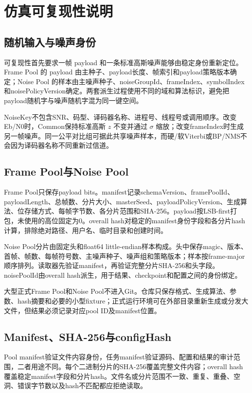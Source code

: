 \chapter{仿真可复现性说明}\label{app:reproducibility}

\section{随机输入与噪声身份}

可复现性首先要求一帧 payload 和一条标准高斯噪声能够由稳定身份重新定位。Frame Pool 的 payload 由主种子、payload长度、帧索引和payload策略版本确定；Noise Pool 的样本由主噪声种子、noiseGroupId、frameIndex、symbolIndex和noisePolicyVersion确定。两套派生过程使用不同的域和算法标识，避免把payload随机字与噪声随机字混为同一键空间。

NoiseKey不包含SNR、码型、译码器名称、进程号、线程号或调用顺序。改变Eb/N0时，Common保持标准高斯 $z$ 不变并通过 $\sigma$ 缩放；改变frameIndex时生成另一帧噪声。同一公平对比组可据此共享噪声样本，而硬/软Viterbi或BP/NMS不会因为译码器名称不同重新过信道。

\section{Frame Pool与Noise Pool}

Frame Pool只保存payload bits。manifest记录schemaVersion、framePoolId、payloadLength、总帧数、分片大小、masterSeed、payloadPolicyVersion、生成算法、位存储方式、每帧字节数、各分片范围和SHA-256。payload按LSB-first打包，未使用的高位固定为0。overall hash对稳定的manifest身份字段和各分片hash计算，排除绝对路径、用户名、临时目录和创建时间。

Noise Pool分片由固定头和float64 little-endian样本构成。头中保存magic、版本、首帧、帧数、每帧符号数、主噪声种子、噪声组和策略版本；样本按frame-major顺序排列。读取器先验证manifest，再验证完整分片SHA-256和头字段。noisePoolId由overall hash派生，用于结果、checkpoint和配置之间的身份绑定。

大型正式Frame Pool和Noise Pool不进入Git。仓库只保存格式、生成算法、参数、hash摘要和必要的小型fixture；正式运行环境可在外部目录重新生成或分发大文件，但结果必须记录对应pool ID及manifest位置。

\section{Manifest、SHA-256与configHash}

Pool manifest验证文件内容身份，任务manifest验证源码、配置和结果的审计范围，二者用途不同。每个二进制分片的SHA-256覆盖完整文件内容；overall hash覆盖稳定manifest字段和分片hash。文件名或分片范围不一致、重复、重叠、空洞、错误字节数以及hash不匹配都应拒绝读取。

